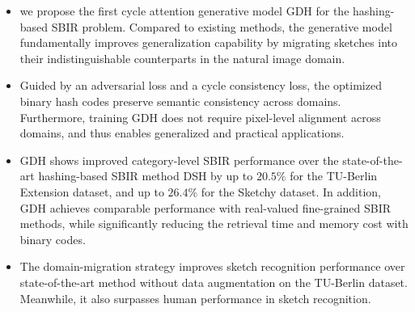  \begin{itemize}
  \item 
  
    we propose the first cycle attention generative model GDH for the hashing-based SBIR problem. 
    Compared to existing methods, the generative model fundamentally improves
    generalization capability by migrating sketches into their indistinguishable counterparts 
    in the natural image domain.
  
  \item Guided by an adversarial loss and a cycle consistency loss, 
  the optimized binary hash codes preserve semantic consistency 
  across domains. Furthermore, training GDH does not require pixel-level 
  alignment across domains, and thus enables generalized and practical applications.

  \item 
  GDH shows improved category-level SBIR performance over the state-of-the-art 
  hashing-based SBIR method DSH \cite{LiuSSLS17} by up to $20.5\%$ for the TU-Berlin 
  Extension dataset, and up to $26.4\%$ for the Sketchy dataset. In addition, 
  GDH achieves comparable performance with real-valued fine-grained SBIR methods, while 
  significantly reducing the retrieval time and memory cost with binary codes. 

  \item
  The domain-migration strategy improves sketch recognition performance over
  state-of-the-art method without data augmentation on the TU-Berlin dataset. 
  Meanwhile, it also surpasses human performance in sketch recognition.
  
 \end{itemize}


